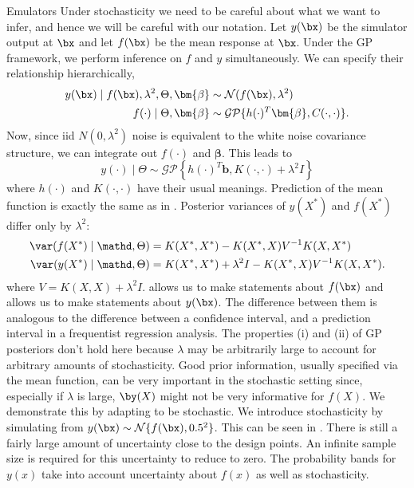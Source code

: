 \begin{chapter}{Emulators \label{Ch:Emulators}}
Under stochasticity we need to be careful about what we want to infer, and hence we will be careful with our notation. Let $y(\bx)$ be the simulator output at $\bx$ and let $f(\bx)$ be the mean response at $\bx$. Under the GP framework, we perform inference on $f$ and $y$ simultaneously. We can specify their relationship hierarchically,
\begin{align}
  y(\bx) \mid f(\bx), \lambda^2, \Theta, \bm{\beta} &\sim \mathcal{N}(f(\bx), \lambda^2) \label{Eq:homgp1} \\
  f(\cdot)  \mid \Theta, \bm{\beta} &\sim \mathcal{GP} \{ h(\cdot)^T \bm{\beta}, C(\cdot, \cdot) \}.\label{Eq:homgp2}
\end{align}
Now, since iid $N(0, \lambda^2)$ noise is equivalent to the white noise covariance structure, we can integrate out $f(\cdot)$ and $\bm{\beta}$. This leads to
\begin{equation}
  y(\cdot) \mid \Theta \sim \mathcal{GP}\left\{ h(\cdot)^T\bm{b}, K(\cdot, \cdot) + \lambda^2 I \right\}
\end{equation}
where $h(\cdot)$ and $K(\cdot, \cdot)$ have their usual meanings. Prediction of the mean function is exactly the same as in . Posterior variances of $y(X^*)$ and $f(X^*)$ differ only by $\lambda^2$:
\begin{align}
  \var(f(X^*) \mid \mathd, \Theta) &= K(X^*, X^*) - K(X^*, X) V^{-1} K(X, X^*)\label{Eq:vary} \\
  \var( y(X^*) \mid \mathd, \Theta) &= K(X^*, X^*)  + \lambda^2 I - K(X^*, X) V^{-1} K(X, X^*).\label{Eq:varf}
\end{align}
where $V = K(X, X) + \lambda^2 I$.  allows us to make statements about $f(\bx)$ and  allows us to make statements about $y(\bx)$. The difference between them is analogous to the difference between a confidence interval, and a prediction interval in a frequentist regression analysis.
The properties (i) and (ii) of GP posteriors don't hold here because $\lambda$ may be arbitrarily large to account for arbitrary amounts of stochasticity. Good prior information, usually specified via the mean function, can be very important in the stochastic setting since, especially if $\lambda$ is large, $\by(X)$ might not be very informative for $f(X)$. We demonstrate this by adapting  to be stochastic. We introduce stochasticity by simulating from $y(\bx) \sim \mathcal{N} \{f(\bx), 0.5^2 \}$. This can be seen in . There is still a fairly large amount of uncertainty close to the design points. An infinite sample size is required for this uncertainty to reduce to zero. The probability bands for $y(x)$ take into account uncertainty about $f(x)$ as well as stochasticity.

\end{chapter}
